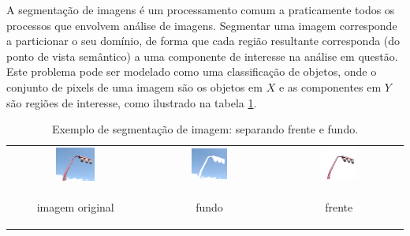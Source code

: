 \documentclass[a4paper,11pt]{article}
\begin{document}
A segmentação de imagens é um processamento comum a praticamente
todos os processos que envolvem análise de imagens. Segmentar uma
imagem corresponde a particionar o seu domínio, de forma que cada
região resultante corresponda (do ponto de vista semântico) a uma
componente de interesse na análise em questão. Este problema pode ser modelado como uma classificação de objetos, onde o conjunto de pixels de uma imagem são os objetos em $X$ e as componentes em $Y$ são regiões de interesse, como ilustrado na tabela \ref{tab:image_segmentation}.

\begin{table}
  \caption{Exemplo de segmentação de imagem: separando frente e fundo.}
  \begin{tabular}[p]{@{}ccc@{}}
    \centering
    \includegraphics[width=0.3\textwidth]{assets/image_segmentation/classification_example.png}
    &
    \includegraphics[width=0.3\textwidth]{assets/image_segmentation/background.png}
    &
    \includegraphics[width=0.3\textwidth]{assets/image_segmentation/foreground.png}

    \\

    imagem original
    &
    fundo
    &
    frente

    \label{tab:image_segmentation}
  \end{tabular}
\end{table}
\end{document}
